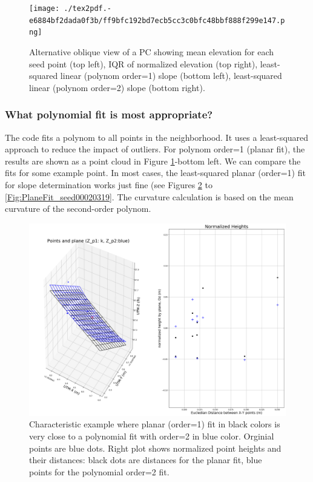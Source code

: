 \documentclass[a4paperpaper,,tablecaptionabove]{scrartcl}
\begin{document}
\begin{figure}
\centering
\texttt{[image: ./tex2pdf.-e6884bf2dada0f3b/ff9bfc192bd7ecb5cc3c0bfc48bbf888f299e147.png]}
\caption{Alternative oblique view of a PC showing mean elevation for
each seed point (top left), IQR of normalized elevation (top right),
least-squared linear (polynom order=1) slope (bottom left),
least-squared linear (polynom order=2) slope (bottom right).
\label{Fig:Cat16_PC_zoom_Z_slope_IQR_results_2nd}}
\end{figure}

\hypertarget{what-polynomial-fit-is-most-appropriate}{%
\subsubsection{What polynomial fit is most
appropriate?}\label{what-polynomial-fit-is-most-appropriate}}

The code fits a polynom to all points in the neighborhood. It uses a
least-squared approach to reduce the impact of outliers. For polynom
order=1 (planar fit), the results are shown as a point cloud in Figure
\ref{Fig:Cat16_PC_zoom_Z_slope_IQR_results_2nd}-bottom left. We can
compare the fits for some example point. In most cases, the
least-squared planar (order=1) fit for slope determination works just
fine (see Figures \ref{Fig:PlaneFit_seed00020901} to
\ref{Fig:PlaneFit_seed00020319}. The curvature calculation is based on
the mean curvature of the second-order polynom.

\begin{figure}
\centering
\includegraphics[width=\textwidth,height=0.9\textheight]{./tex2pdf.-e6884bf2dada0f3b/b096a2b8e56eebc80f4b8556f702600ef12f3085.png}
\caption{Characteristic example where planar (order=1) fit in black
colors is very close to a polynomial fit with order=2 in blue color.
Orginial points are blue dots. Right plot shows normalized point heights
and their distances: black dots are distances for the planar fit, blue
points for the polynomial order=2 fit.\label{Fig:PlaneFit_seed00020901}}
\end{figure}
\end{document}
